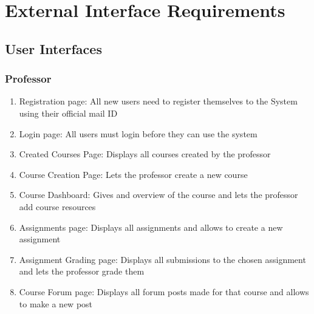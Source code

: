 \documentclass[12pt, a4]{report}
\begin{document}

\chapter{External Interface Requirements}
\section{User Interfaces}

\subsection{Professor}
\begin{enumerate}
    \item Registration page: All new users need to register themselves to the System using their official mail ID
    \item Login page: All users must login before they can use the system
    \item Created Courses Page: Displays all courses created by the professor
    \item Course Creation Page: Lets the professor create a new course
    \item Course Dashboard: Gives and overview of the course and lets the professor add course resources
    \item Assignments page: Displays all assignments and allows to create a new assignment
    \item Assignment Grading page: Displays all submissions to the chosen assignment and lets the professor grade them
    \item Course Forum page: Displays all forum posts made for that course and allows to make a new post
\end{enumerate}
\end{document}
